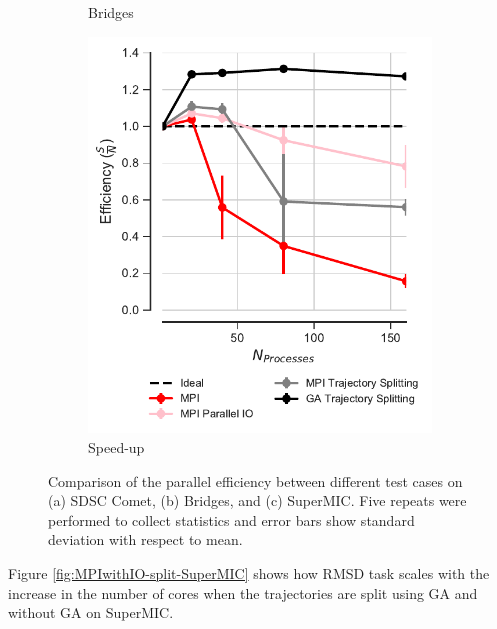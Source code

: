 \begin{figure}[ht!]
\begin{subfigure}{.35\textwidth}
  \caption{Bridges}
  \label{fig:comparison_efficiency_Bridges}
\end{subfigure}
\hfill
\begin{subfigure}{.3\textwidth}
  \includegraphics[width=\linewidth]{figures/Comparison_Efficiency_all_SuperMIC.pdf}
  \caption{Speed-up}
  \label{fig:comparison_efficiency_SuperMIC}
\end{subfigure}

\caption{Comparison of the parallel efficiency between different test cases on (a) SDSC Comet, (b) Bridges, and (c) SuperMIC.
Five repeats were performed to collect statistics and error bars show standard deviation with respect to mean.}
\label{fig:comparison_efficiency}
\end{figure} 

Figure \ref{fig:MPIwithIO-split-SuperMIC} shows how RMSD task scales with the increase in the number of cores when the trajectories are split using GA and without GA on SuperMIC.  
 
